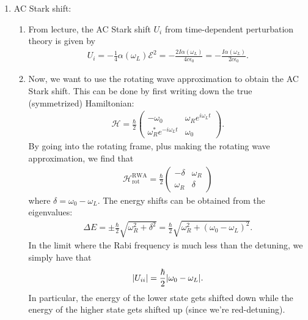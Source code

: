 \documentclass{article}
\theoremstyle{definition}
\newcommand{\ham}{\mathcal{H}}
\newcommand{\al}{\alpha}
\newcommand{\f}[2]{\frac{#1}{#2}}
\begin{document}
\begin{enumerate}[label=(\alph*)]
	\item AC Stark shift: 
	
	\begin{enumerate}[label=(\roman*)]
		\item From lecture, the AC Stark shift $U_i$ from time-dependent perturbation theory is given by 
		\begin{align*}
		U_i = -\f{1}{4}\al(\omega_L) \mathcal{E}^2 = -\f{2I\al(\omega_L)}{4c\epsilon_0} = -\f{I\al(\omega_L)}{2c\epsilon_0}.
		\end{align*}
		
		
		\item Now, we want to use the rotating wave approximation to obtain the AC Stark shift. This can be done by first writing down the true (symmetrized) Hamiltonian:
		\begin{align*}
		\ham = \f{\hbar}{2}\begin{pmatrix}
		-\omega_0 & \omega_R e^{i\omega_L t} \\ \omega_R^* e^{-i\omega_L t} & \omega_0
		\end{pmatrix}.
		\end{align*}
		By going into the rotating frame, plus making the rotating wave approximation, we find that
		\begin{align*}
		\ham_\text{rot}^\text{RWA} = \f{\hbar}{2}\begin{pmatrix}
		-\delta & \omega_R \\ \omega_R & \delta
		\end{pmatrix}
		\end{align*}
		where $\delta = \omega_0 - \omega_L$. The energy shifts can be obtained from the eigenvalues:
		\begin{align*}
		\Delta E = \pm  \f{\hbar}{2}\sqrt{\omega_R^2 + \delta^2} = \f{\hbar}{2}\sqrt{\omega_R^2 + (\omega_0 - \omega_L)^2}.
		\end{align*}
		In the limit where the Rabi frequency is much less than the detuning, we simply have that
		\begin{align*}
		\abs{U_{ii}} = \f{\hbar}{2}\abs{\omega_0 - \omega_L}. 
		\end{align*}
		In particular, the energy of the lower state gets shifted down while the energy of the higher state gets shifted up (since we're red-detuning). 
		

\end{enumerate}
\end{enumerate}
\end{document}
